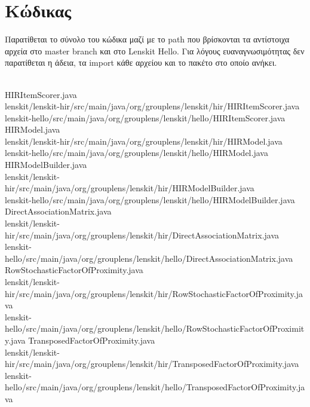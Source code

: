 \chapter{Κώδικας}
Παρατίθεται το σύνολο του κώδικα μαζί με το {\en path} που βρίσκονται τα αντίστοιχα αρχεία στο {\en master branch} και στο {\en Lenskit Hello}. Για λόγους ευαναγνωσιμότητας δεν παρατίθεται η άδεια, τα {\en import} κάθε αρχείου και το πακέτο στο οποίο ανήκει.\\ \\
\begin{scriptsize}
{\en HIRItemScorer.java\\
lenskit/lenskit-hir/src/main/java/org/grouplens/lenskit/hir/HIRItemScorer.java\\
lenskit-hello/src/main/java/org/grouplens/lenskit/hello/HIRItemScorer.java
}
\clearpage
{\en HIRModel.java\\
lenskit/lenskit-hir/src/main/java/org/grouplens/lenskit/hir/HIRModel.java\\
lenskit-hello/src/main/java/org/grouplens/lenskit/hello/HIRModel.java
}
\clearpage
{\en HIRModelBuilder.java\\
lenskit/lenskit-hir/src/main/java/org/grouplens/lenskit/hir/HIRModelBuilder.java\\
lenskit-hello/src/main/java/org/grouplens/lenskit/hello/HIRModelBuilder.java
}
\clearpage
{\en DirectAssociationMatrix.java\\
lenskit/lenskit-hir/src/main/java/org/grouplens/lenskit/hir/DirectAssociationMatrix.java\\
lenskit-hello/src/main/java/org/grouplens/lenskit/hello/DirectAssociationMatrix.java
 }
\clearpage
{\en RowStochasticFactorOfProximity.java\\
lenskit/lenskit-hir/src/main/java/org/grouplens/lenskit/hir/RowStochasticFactorOfProximity.java\\
lenskit-hello/src/main/java/org/grouplens/lenskit/hello/RowStochasticFactorOfProximity.java
 }
 \clearpage
{\en TransposedFactorOfProximity.java\\
lenskit/lenskit-hir/src/main/java/org/grouplens/lenskit/hir/TransposedFactorOfProximity.java\\
lenskit-hello/src/main/java/org/grouplens/lenskit/hello/TransposedFactorOfProximity.java }

\end{scriptsize}

